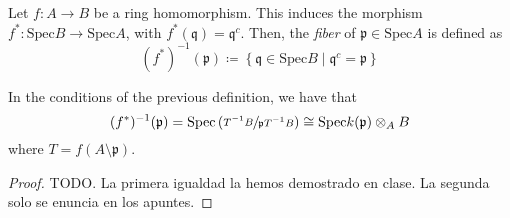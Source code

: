         \begin{defn}
            Let $f: A \longrightarrow B$ be a ring homomorphism.
            This induces the morphism $f^*:\text{Spec} B \longrightarrow\text{Spec} A$, with $f^*(\mathfrak{q}) = \mathfrak{q}^c$.
            Then, the \emph{fiber} of $\mathfrak{p} \in\text{Spec}A$ is defined as
            \[
                (f^*)^{-1}(\mathfrak{p}) \coloneqq \left\{ \mathfrak{q} \in\text{Spec} B \mid \mathfrak{q}^c = \mathfrak{p} \right\}
            \]
        \end{defn}

        \begin{prop}
            In the conditions of the previous definition, we have that
            \[
                (f^*)^{-1}(\mathfrak{p}) =\text{Spec} \left( \sfrac{T^{-1}B}{\mathfrak{p}T^{-1}B} \right) \cong\text{Spec} k(\mathfrak{p}) \otimes_A B
            \]
            where $T = f(A \setminus \mathfrak{p})$.
        \end{prop}
            \begin{proof}

                TODO. La primera igualdad la hemos demostrado en clase.
                La segunda solo se enuncia en los apuntes.

            \end{proof}

        